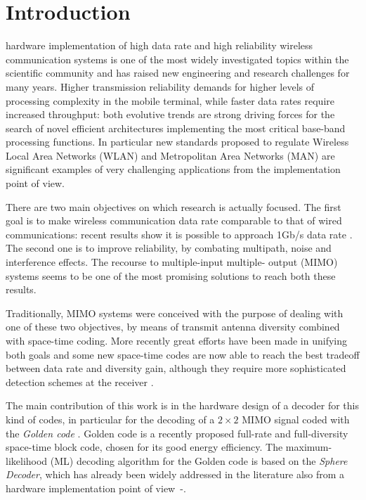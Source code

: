 \documentclass[12pt,onecolumn,draftclsnofoot]{IEEEtran}
\begin{document}
\section{Introduction}
 hardware implementation of high data rate and high
reliability wireless communication systems is one of the most
widely investigated topics within the scientific community and has
raised new engineering and research challenges for many years.
Higher transmission reliability demands for higher levels of
processing complexity in the mobile terminal, while faster data
rates require increased throughput: both evolutive trends are
strong driving forces for the search of novel efficient
architectures implementing the most critical base-band processing
functions. In particular new standards proposed to regulate Wireless
Local Area Networks (WLAN) and Metropolitan Area Networks (MAN) are
significant examples of very challenging applications from the
implementation point of view.




There are two main objectives on which research is actually
focused. The first goal is to make wireless communication data rate comparable
to that
of wired communications: recent results show it is possible to approach 1Gb/s
data rate\cite{gigabit, gigabit2} . The second one is to improve reliability,
by combating multipath,
noise and interference effects. The recourse to multiple-input multiple-
output (MIMO) systems seems to be one of the most promising solutions to reach both
these results.

Traditionally, MIMO systems were conceived with the purpose of dealing with one of these two
objectives, by means of transmit antenna diversity combined with space-time
coding.
More recently great efforts have been made in unifying both goals and
some new space-time codes are now able to reach the best tradeoff between data rate
and diversity gain, although they require more sophisticated detection schemes
at the receiver \cite{LD-STBC, CODES2, CODES3, Golden1, Golden2, Golden3}.

The main contribution of this work is in the hardware design of a
decoder for this kind of codes, in particular for the decoding of a
$2\times 2$ MIMO signal coded with the {\em Golden code}
\cite{Golden1}. Golden code is a recently proposed full-rate and
full-diversity space-time block code, chosen for its good energy
efficiency. The maximum-likelihood (ML) decoding algorithm for the Golden
code is based on the \emph{Sphere Decoder}, which has already been
widely addressed in the literature also from a hardware
implementation point of view~\cite{ControCompl}-\cite{Kbest}.
\end{document}
